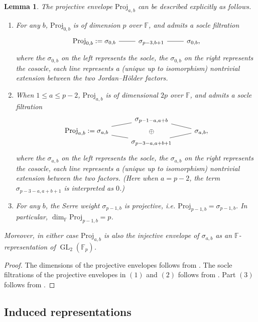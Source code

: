 \documentclass[12pt]{amsart}
\newtheorem{lemma}[subsection]{Lemma}
\theoremstyle{definition}
\numberwithin{equation}{subsection}
\def\FF{\mathbb{F}}
\newcommand{\Proj}{\mathrm{Proj}}
\DeclareMathOperator{\GL}{GL}
\begin{document}
\begin{lemma}
\label{L:projective envelope}
The projective envelope $\Proj_{a,b}$ can be described explicitly as follows.
\begin{enumerate}
\item
For any $b$, $\Proj_{0,b}$ is of dimension $p$ over $\FF$, and admits a socle filtration
\[
\begin{tikzcd}
\Proj_{0,b}: = \sigma_{0,b} \ar[r, -]& \sigma_{p-3, b+1} \ar[r, -] &\sigma_{0,b},
\end{tikzcd}
\]
where the $\sigma_{0,b}$ on the left represents the socle, the $\sigma_{0,b}$ on the right represents the cosocle, each line represents a (unique up to isomorphism) nontrivial extension between the two Jordan--H\"older factors.

\item
When $1 \leq a \leq p-2$, $\Proj_{a,b}$ is of dimensional $2p$ over $\FF$, and admits a socle filtration 
\[
\begin{tikzcd}[row sep = 0pt]
& \sigma_{p-1-a,a+b} \ar[rd,-] \ar[dd, phantom, "\oplus" description]
\\
\Proj_{a,b}: = \sigma_{a,b} \ar[ru,-] \ar[rd,-] && \sigma_{a,b}, \\
& \sigma_{p-3-a,a+b+1} \ar[ru,-]
\end{tikzcd}
\]
where the $\sigma_{a,b}$ on the left represents the socle, the $\sigma_{a,b}$ on the right represents the cosocle, each line represents a (unique up to isomorphism) nontrivial extension between the two factors. (Here when $a=p-2$, the term $\sigma_{p-3-a, a+b+1}$ is interpreted as $0$.)

\item
For any $b$, the Serre weight $\sigma_{p-1,b}$ is projective, i.e. $\Proj_{p-1,b} = \sigma_{p-1,b}$. In particular, $\dim_\FF\Proj_{p-1,b} = p$.
\end{enumerate}


Moreover, in either case $\Proj_{a,b}$ is also the injective envelope of $\sigma_{a,b}$ as an $\FF$-representation of $\GL_2(\FF_p)$.
\end{lemma}
\begin{proof}
The dimensions of the projective envelopes follows from \cite[Lemma~4.1.7]{paskunas}. The socle filtrations of the projective envelopes in $(1)$ and $(2)$ follows from \cite[Lemma~3.4, Lemma~3.5]{breuil-paskunas}. Part $(3)$ follows from \cite[Corollary~4.2.22]{paskunas}.
\end{proof}


\subsection{Induced representations}
\end{document}
